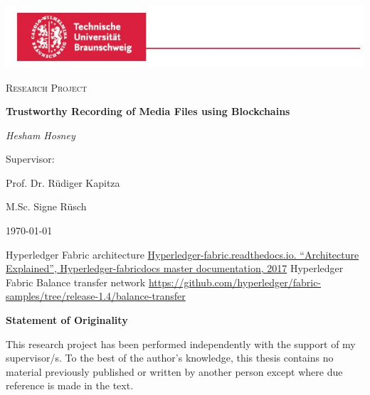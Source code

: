 \documentclass{report}
\begin{document}
\begin{titlepage}
	\centering
	\includegraphics[width=\paperwidth]{images/logo.jpg}\par\vspace{1cm}
	{\scshape\LARGE  \par}
	\vspace{1cm}
	{\scshape\Large Research Project\par}
	\vspace{1.5cm}
	{\huge\bfseries Trustworthy Recording of Media Files using Blockchains \par}
	\vspace{1cm}
	{\huge\itshape Hesham Hosney\par}
        \vspace{2cm} 
	{\Large Supervisor:\par } 
	{\huge Prof. Dr. Rüdiger Kapitza\par}
        \vspace{.5cm} 
        {\huge M.Sc. Signe Rüsch}
	\vfill
	{\large \today\par}
\end{titlepage}


\cleardoublepage

\tableofcontents

\cleardoublepage








\cleardoublepage
\listoffigures
\begin{thebibliography}{9}

Hyperledger Fabric architecture
\url{Hyperledger-fabric.readthedocs.io. “Architecture Explained”, Hyperledger-fabricdocs master documentation, 2017}
Hyperledger Fabric Balance transfer network 
\url{https://github.com/hyperledger/fabric-samples/tree/release-1.4/balance-transfer}



\appendix
\end{thebibliography}
\cleardoublepage
\centerline{\bfseries Statement of Originality}
	\vspace*{1em}
	\noindent
	This research project has been performed independently with the support of my supervisor/s.
	To the best of the author's knowledge, this thesis contains no material previously
	published or written by another person except where due reference is made in the text.
\end{document}
